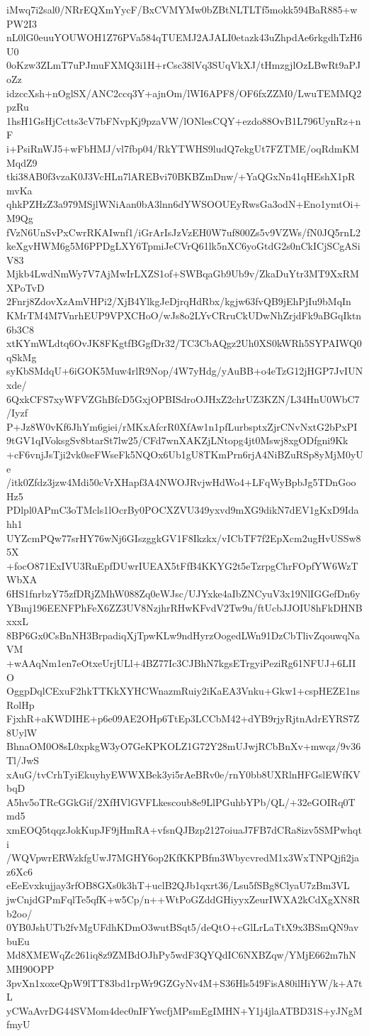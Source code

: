 iMwq7i2sal0/NRrEQXmYycF/BxCVMYMw0bZBtNLTLTf5mokk594BaR885+wPW2I3
nL0lG0euuYOUWOH1Z76PVa584qTUEMJ2AJALI0etazk43uZhpdAe6rkgdhTzH6U0
0oKzw3ZLmT7uPJmuFXMQ3i1H+rCsc38lVq3SUqVkXJ/tHmzgjlOzLBwRt9aPJoZz
idzccXsh+nOglSX/ANC2ccq3Y+ajnOm/lWI6APF8/OF6fxZZM0/LwuTEMMQ2pzRu
1hsH1GsHjCctts3cV7bFNvpKj9pzaVW/lONlesCQY+ezdo88OvB1L796UynRz+nF
i+PsiRnWJ5+wFbHMJ/vl7fbp04/RkYTWHS9ludQ7ekgUt7FZTME/oqRdmKMMqdZ9
tki38AB0f3vzaK0J3VcHLn7lAREBvi70BKBZmDnw/+YaQGxNn41qHEshX1pRmvKa
qhkPZHzZ3a979MSjlWNiAan0bA3lnn6dYWSOOUEyRwsGa3odN+Eno1ymtOi+M9Qg
fVzN6UnSvPxCwrRKAIwnf1/iGrArIsJzVzEH0W7uf800Zs5v9VZWs/fN0JQ5rnL2
keXgvHWM6g5M6PPDgLXY6TpmiJeCVrQ61lk5nXC6yoGtdG2s0nCkICjSCgASiV83
Mjkb4LwdNmWy7V7AjMwIrLXZS1of+SWBqaGb9Ub9v/ZkaDuYtr3MT9XxRMXPoTvD
2Fnrj8ZdovXzAmVHPi2/XjB4YlkgJeDjrqHdRbx/kgjw63fvQB9jEhPjIu9bMqIn
KMrTM4M7VnrhEUP9VPXCHoO/wJs8o2LYvCRruCkUDwNhZrjdFk9aBGqIktn6b3C8
xtKYmWLdtq6OvJK8FKgtfBGgfDr32/TC3CbAQgz2Uh0XS0kWRh5SYPAIWQ0qSkMg
syKbSMdqU+6iGOK5Muw4rlR9Nop/4W7yHdg/yAuBB+o4eTzG12jHGP7JvIUNxde/
6QxkCFS7xyWFVZGhBfcD5GxjOPBISdroOJHxZ2chrUZ3KZN/L34HnU0WbC7/Iyzf
P+Jz8W0vKf6JhYm6giei/rMKxAfcrR0XfAw1n1pfLurbsptxZjrCNvNxtG2bPxPI
9tGV1qIVoksgSv8btarSt7lw25/CFd7wnXAKZjLNtopg4jt0Mswj8xgODfgni9Kk
+cF6vnjJsTji2vk0seFWseFk5NQOx6Ub1gU8TKmPrn6rjA4NiBZuRSp8yMjM0yUe
/itk0Zfdz3jzw4Mdi50cVrXHapf3A4NWOJRvjwHdWo4+LFqWyBpbJg5TDnGooHz5
PDlpl0APmC3oTMcls1lOcrBy0POCXZVU349yxvd9mXG9dikN7dEV1gKxD9Idahh1
UYZcmPQw77srHY76wNj6GIszggkGV1F8Ikzkx/vICbTF7f2EpXcm2ugHvUSSw85X
+focO871ExIVU3RuEpfDUwrIUEAX5tFfB4KKYG2t5eTzrpgChrFOpfYW6WzTWbXA
6HS1fnrbzY75zfDRjZMhW088Zq0eWJsc/UJYxke4aIbZNCyuV3x19NlIGGefDn6y
YBmj196EENFPhFeX6ZZ3UV8NzjhrRHwKFvdV2Tw9u/ftUcbJJOIU8hFkDHNBxxxL
8BP6Gx0CsBnNH3BrpadiqXjTpwKLw9ndHyrzOogedLWn91DzCbTlivZqouwqNaVM
+wAAqNm1en7eOtxeUrjULl+4BZ77Ic3CJBhN7kgsETrgyiPeziRg61NFUJ+6LIIO
OggpDqlCExuF2hkTTKkXYHCWnazmRuiy2iKaEA3Vnku+Gkw1+cspHEZE1nsRolHp
FjxhR+aKWDIHE+p6e09AE2OHp6TtEp3LCCbM42+dYB9rjyRjtnAdrEYRS7Z8UylW
BhnaOM0O8sL0xpkgW3yO7GeKPKOLZ1G72Y28mUJwjRCbBnXv+mwqz/9v36Tl/JwS
xAuG/tvCrhTyiEkuyhyEWWXBek3yi5rAeBRv0e/rnY0bb8UXRlnHFGslEWfKVbqD
A5hv5oTRcGGkGif/2XfHVlGVFLkescoub8e9LlPGuhbYPb/QL/+32eGOIRq0Tmd5
xmEOQ5tqqzJokKupJF9jHmRA+vfsnQJBzp2127oiuaJ7FB7dCRa8izv5SMPwhqti
/WQVpwrERWzkfgUwJ7MGHY6op2KfKKPBfm3WbycvredM1x3WxTNPQjfi2jaz6Xc6
eEeEvxkujjay3rfOB8GXs0k3hT+uclB2QJb1qxrt36/Lsu5fSBg8ClyaU7zBm3VL
jwCnjdGPmFqlTe5qfK+w5Cp/n++WtPoGZddGHiyyxZeurIWXA2kCdXgXN8Rb2oo/
0YB0JshUTb2fvMgUFdhKDmO3wutBSqt5/deQtO+cGlLrLaTtX9x3BSmQN9avbuEu
Md8XMEWqZc261iq8z9ZMBdOJhPy5wdF3QYQdIC6NXBZqw/YMjE662m7hNMH90OPP
3pvXn1xoxeQpW9lTT83bd1rpWr9GZGyNv4M+S36Hls549FisA80ilHiYW/k+A7tL
yCWaAvrDG44SVMom4dec0nIFYwcfjMPsmEgIMHN+Y1j4jlaATBD31S+yJNgMfmyU
